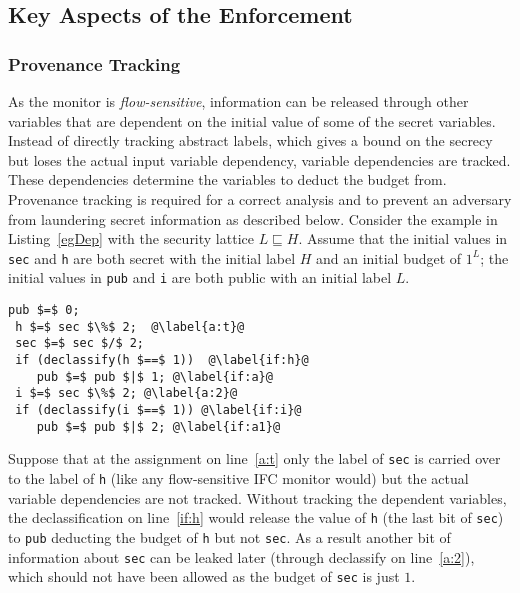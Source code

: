 \subsection{Key Aspects of the Enforcement}
\label{sec:enf-design}

\subsubsection{Provenance Tracking}
As the monitor is \emph{flow-sensitive}, information can be released
through other variables that are dependent on the initial value of
some of the secret variables. Instead of directly tracking abstract
labels, which gives a bound on the secrecy but loses the actual input
variable dependency, variable dependencies are tracked. These
dependencies determine the  variables to deduct the budget
from. Provenance tracking is required for a correct analysis 
and to prevent an adversary from laundering secret information as
described below. Consider the example in Listing~\ref{egDep} with the 
security lattice $L \sqsubseteq H$. Assume that the initial values in
\texttt{sec} and \texttt{h} are both secret with the initial label $H$
and an initial budget of $1^L$; the initial values in \texttt{pub} and
\texttt{i} are both public with an initial label $L$.

\begin{lstlisting}[float,caption=Leak due to dependent variables, label=egDep]
 pub $=$ 0;
 h $=$ sec $\%$ 2;  @\label{a:t}@
 sec $=$ sec $/$ 2;
 if (declassify(h $==$ 1))  @\label{if:h}@
    pub $=$ pub $|$ 1; @\label{if:a}@
 i $=$ sec $\%$ 2; @\label{a:2}@
 if (declassify(i $==$ 1)) @\label{if:i}@
    pub $=$ pub $|$ 2; @\label{if:a1}@
\end{lstlisting}

Suppose that at the assignment on line~\ref{a:t} only the label of
\texttt{sec} is carried over to the label of \texttt{h} (like any flow-sensitive IFC
monitor would) but the actual variable dependencies are not tracked.  Without 
tracking the dependent variables, the declassification on line~\ref{if:h}
would release the value of \texttt{h} (the last bit of \texttt{sec}) to
\texttt{pub} deducting the budget of \texttt{h} but not \texttt{sec}. As a
result another bit of information about \texttt{sec} can be leaked later
(through declassify on line~\ref{a:2}), which should not have been
allowed as the budget of \texttt{sec} is just $1$.


